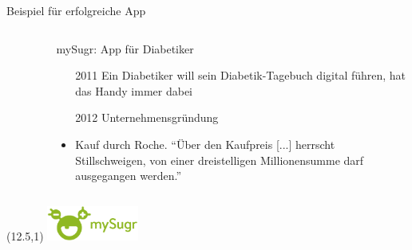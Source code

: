 \documentclass[aspectratio=169,t]{beamer}
\begin{document}
\begin{frame}{Beispiel für erfolgreiche App}
\begin{columns}
\begin{column}{0.6\textwidth}
\begin{figure}
            \end{figure}    
        \end{column}
        \begin{column}{0.4\textwidth}
            \noindent mySugr: App für Diabetiker
            \begin{itemize}
                \item[2011] Ein Diabetiker will sein Diabetik-Tagebuch digital führen, hat das Handy immer dabei
                \item[2012] Unternehmensgründung
                \item<2->[2017] Kauf durch Roche. ``Über den Kaufpreis [...] herrscht Stillschweigen, von einer dreistelligen Millionensumme darf ausgegangen werden.'' \cite{mysugrverkauf}
            \end{itemize}
        \end{column}
    \end{columns}
    \begin{textblock}{15}(12.5,1)
        \includegraphics[width=3cm]{Bilder/mysugrlogo.png}
    \end{textblock}
\end{frame}
\end{document}
